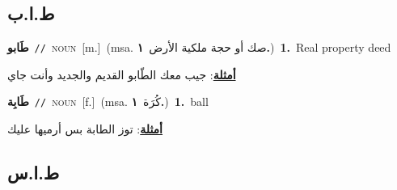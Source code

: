 \documentclass[10pt,a4paper,twoside]{article} %
\begin{document}
\begin{multicols}{2}
\vspace{-3mm}
\subsection*{\color{blue}\foreignlanguage{arabic}{ط.ا.ب}\color{blue}{ (ntws)}} 

{\setlength\topsep{0pt}\textbf{\foreignlanguage{arabic}{طَابو}}\ {\color{gray}\texttt{//}\color{black}}\ \textsc{noun}\ [m.]\ \color{gray}(msa. \foreignlanguage{arabic}{صك أو حجة ملكية الأرض}~\foreignlanguage{arabic}{\textbf{١.}})\color{black}\ \textbf{1.}~Real property deed\  \begin{flushright}\color{gray}\foreignlanguage{arabic}{\textbf{\underline{\foreignlanguage{arabic}{أمثلة}}}: جيب معك الطّابو القديم والجديد وأنت جاي}\end{flushright}\color{black}} \vspace{2mm}

{\setlength\topsep{0pt}\textbf{\foreignlanguage{arabic}{طَابِة}}\ {\color{gray}\texttt{//}\color{black}}\ \textsc{noun}\ [f.]\ \color{gray}(msa. \foreignlanguage{arabic}{كُرَة}~\foreignlanguage{arabic}{\textbf{١.}})\color{black}\ \textbf{1.}~ball\  \begin{flushright}\color{gray}\foreignlanguage{arabic}{\textbf{\underline{\foreignlanguage{arabic}{أمثلة}}}: توز الطابة بس أرميها عليك}\end{flushright}\color{black}} \vspace{2mm}

\vspace{-3mm}
\subsection*{\color{blue}\foreignlanguage{arabic}{ط.ا.س}\color{blue}{ (ntws)}} 


\end{multicols}
\end{document}
